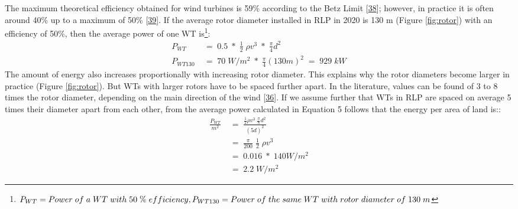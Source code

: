 \documentclass[a4paper,11pt]{article}
\begin{document}
The maximum theoretical efficiency obtained for wind turbines is 59\% according to the Betz Limit {[}\protect\hyperlink{ref-A.Betz.1920}{38}{]}; however, in practice it is often around 40\% up to a maximum of 50\% {[}\protect\hyperlink{ref-WindwartsEnergieausdemNorden.2021}{39}{]}. If the average rotor diameter installed in RLP in 2020 is 130 m (Figure \ref{fig:rotor}) with an efficiency of 50\%, then the average power of one WT is\footnote{\(P_{WT}=Power\; of\; a\; WT\; with\; 50\; \%\; efficiency,\;\\ P_{WT130}=Power\; of\; the\; same\; WT\; with\; rotor\; diameter\; of\; 130\; m\)}:
\begin{equation}
\begin{split}
P_{WT}\; & =\; 0.5\; *\; \frac{1}{2}\; \rho v^3\; *\; \frac{\pi}{4}d^2 \\
P_{WT130}\; & =\; 70\; W/m^2\; *\; \frac{\pi}{4}(130 m)^2\; =\; 929\; kW
\end{split}
\end{equation}
The amount of energy also increases proportionally with increasing rotor diameter. This explains why the rotor diameters become larger in practice (Figure \ref{fig:rotor}). But WTs with larger rotors have to be spaced further apart. In the literature, values can be found of 3 to 8 times the rotor diameter, depending on the main direction of the wind {[}\protect\hyperlink{ref-DavidJCMacKay.2009}{36}{]}. If we assume further that WTs in RLP are spaced on average 5 times their diameter apart from each other, from the average power calculated in Equation 5 follows that the energy per area of land is::
\begin{equation}
\begin{split}
\frac{P_{WT}}{m^2}\; & =\; \frac{\frac{1}{2} \rho v^3\; \frac{\pi}{8}d^2}{(5d)^2} \\
 & =\; \frac{\pi}{200}\; \frac{1}{2}\; \rho v^3 \\
 & =\; 0.016\; *\; 140 W/m^2 \\
 & =\; 2.2\; W/m^2
\end{split}
\end{equation}
\end{document}
